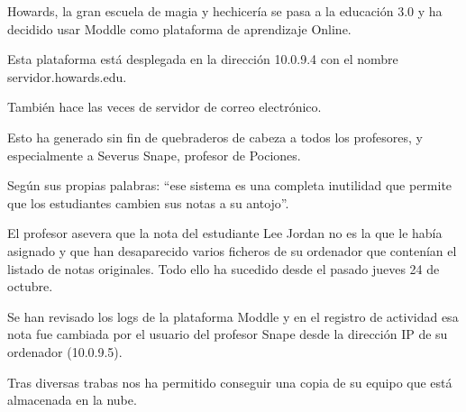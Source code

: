 Howards, la gran escuela de magia y hechicería se pasa a la educación 3.0 y ha decidido usar Moddle como plataforma de aprendizaje Online. \par
\noindent Esta plataforma está desplegada en la dirección 10.0.9.4 con el nombre servidor.howards.edu.\par
\noindent También hace las veces de servidor de correo electrónico.\par
\noindent Esto ha generado sin fin de quebraderos de cabeza a todos los profesores, y especialmente a Severus Snape, profesor de Pociones.\par
\noindent Según sus propias palabras: “ese sistema es una completa inutilidad que permite que los estudiantes cambien sus notas a su antojo”.\par
\noindent El profesor asevera que la nota del estudiante Lee Jordan no es la que le había asignado y que han desaparecido varios ficheros de su ordenador que contenían el listado de notas originales. Todo ello ha sucedido desde el pasado jueves 24 de octubre.\par
\noindent Se han revisado los logs de la plataforma Moddle y en el registro de actividad esa nota fue cambiada por el usuario del profesor Snape desde la dirección IP de su ordenador (10.0.9.5).\par
\noindent Tras diversas trabas nos ha permitido conseguir una copia de su equipo que está almacenada en la nube.\par
